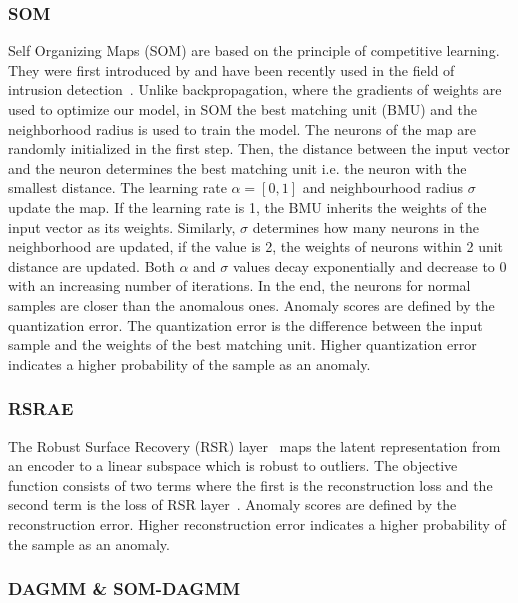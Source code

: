 \documentclass{article}
\begin{document}
\subsubsection{SOM}
 Self Organizing Maps (SOM) are based on the principle of competitive learning. They were first introduced by \citep{kohonen1990self} and have been recently used in the field of intrusion detection~\citep{chen2021multi}. Unlike backpropagation, where the gradients of weights are used to optimize our model, in SOM the best matching unit (BMU) and the neighborhood radius is used to train the model. The neurons of the map are randomly initialized in the first step. Then, the distance between the input vector and the neuron determines the best matching unit i.e. the neuron with the smallest distance. The learning rate $ \alpha = [ 0, 1]$ and neighbourhood radius $\sigma$ update the map. If the learning rate is 1, the BMU inherits the weights of the input vector as its weights. Similarly, $\sigma $ determines how many neurons in the neighborhood are updated, if the value is 2, the weights of neurons within 2 unit distance are updated. Both $\alpha$ and $\sigma$ values decay exponentially and decrease to 0 with an increasing number of iterations. In the end, the neurons for normal samples are closer than the anomalous ones. Anomaly scores are defined by the quantization error. The quantization error is the difference between the input sample and the weights of the best matching unit. Higher quantization error indicates a higher probability of the sample as an anomaly.

\subsubsection{RSRAE}

The Robust Surface Recovery (RSR) layer~\citep{rsrae} maps the latent representation from an encoder to a linear subspace which is robust to outliers. The objective function consists of two terms where the first is the reconstruction loss and the second term is the loss of RSR layer~\citep{lerman2019}. Anomaly scores are defined by the reconstruction error. Higher reconstruction error indicates a higher probability of the sample as an anomaly.

\subsubsection{DAGMM \& SOM-DAGMM}
\end{document}
